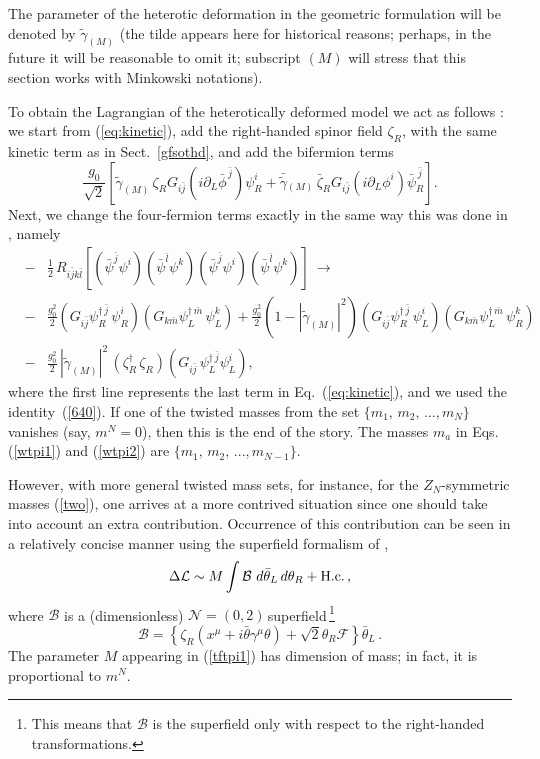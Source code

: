 \documentclass[epsfig,12pt]{article}
\def\beq{\begin{equation}}
\def\eeq{\end{equation}}
\def\beqn{\begin{eqnarray}}
\def\eeqn{\end{eqnarray}}
\newcommand{\nzt}{${\mathcal N}=(0,2)\,$}
\newcommand{\cell}{{\mathcal L}}
\newcommand{\pt}{\partial}
\newcommand{\zn}{$Z_N$}
\def\beqn{\begin{eqnarray}}
\def\eeqn{\end{eqnarray}}
\def\beq{\begin{equation}}
\def\eeq{\end{equation}}
\newcommand{\ssm}{{\scriptscriptstyle(M)}}
\begin{document}
{The parameter of the heterotic deformation in the geometric formulation will be denoted by
$\tilde \gamma_\ssm$ (the tilde appears here for historical reasons;
perhaps, in the future it will be reasonable to omit it;
subscript $\scriptstyle (M)$ will stress that this section works with Minkowski notations).

To obtain the Lagrangian of the heterotically deformed model
we act as follows \cite{BSY3}: we start from (\ref{eq:kinetic}), add the
 right-handed spinor field $\zeta_R$, with the same kinetic term as in Sect.~\ref{gfsothd}, and
 add the bifermion terms
 \beq
 \frac{g_0}{\sqrt 2}
 \left[ \tilde{\gamma}_\ssm\, \zeta_RG_{i\bar j}\left(i\pt_L\bar\phi^{\,\bar j}\right)\psi_R^i + 
        \bar{\tilde \gamma}{}_\ssm\, \bar\zeta_R G_{i\bar j}\left(i\pt_L\phi^{i}
 \right)\bar\psi_R^{\,\bar j} 
 \right].
 \eeq
Next, we change the four-fermion terms exactly in the same way this was done in
 \cite{SY1},
 namely
 \beqn
&-&\frac{1}{2} \,R_{i\bar jk\bar l}\left[\left(\bar\psi^{\bar j}\psi^{i}\right)\left(\bar\psi^{\bar l}\psi^{k}\right)
\left(\bar\psi^{\bar j}\psi^{i}\right)\left(\bar\psi^{\bar l}\psi^{k}\right)
\right]
~\longrightarrow~
\nonumber\\[3mm]
&-& \frac{g_0^2}{2}\left( G_{i\bar j}\psi^{\dagger\, \bar j}_R\, \psi^{ i}_R\right)
\left( G_{k\bar m}\psi^{\dagger\, \bar m}_L\, \psi^{ k}_L\right)+
\frac{g_0^2}{2}\left(1-|\tilde\gamma_\ssm|^2\right)
\left( G_{i\bar j}\psi^{\dagger\, \bar j}_R\, \psi^{ i}_L\right)
\left( G_{k\bar m}\psi^{\dagger\, \bar m}_L\, \psi^{ k}_R\right)\,
\nonumber
\\[4mm]
&-&
 \frac{g_0^2}{2} \, |\tilde{\gamma}_\ssm |^2 \,\left(\zeta_R^\dagger\, \zeta_R
\right)\left(G_{i\bar j}\,  \psi_L^{\dagger\,\bar j}\psi_L^i\right),
\eeqn
 where the first line represents the last term in Eq.~(\ref{eq:kinetic}), and we used the identity~(\ref{640}).
 If one of the twisted masses from the set  $\{m_1,\,m_2,\, ..., m_N\}$ vanishes (say, $m^N=0$),
then this is the end of the story. The masses 
$m_a$ in Eqs. (\ref{wtpi1}) and (\ref{wtpi2}) are $\{m_1,\,m_2,\, ..., m_{N-1}\}$.

However, with more general twisted mass sets,
for instance, for the \zn-symmetric masses (\ref{two}), 
one arrives at a more contrived situation since 
one should take into account an extra contribution.
Occurrence of this contribution can be seen \cite{BSY3} in a relatively concise
manner using the superfield formalism of \cite{SY1},
\beq
\Delta\cell \sim M\int  {\mathcal B}\,\,  d\bar\theta_L \, d\theta_R + {\rm H. c.}\,,
\label{tftpi1}
\eeq
where
${\mathcal B}$ is a (dimensionless) \nzt superfield\,\footnote{This means that ${\mathcal B}$
is the superfield only with respect to the right-handed transformations.}
\beq
{\mathcal B} =\left\{\zeta_R\left(x^\mu + i\bar\theta\gamma^\mu\theta\right) +\sqrt{2} \theta_R {\mathcal F}
\right\} \bar\theta_L\,.
\label{tftpi2}
\eeq
 The parameter $M$ appearing in (\ref{tftpi1}) has dimension of mass; in fact, it is proportional to $m^N$.
 
}
\end{document}
